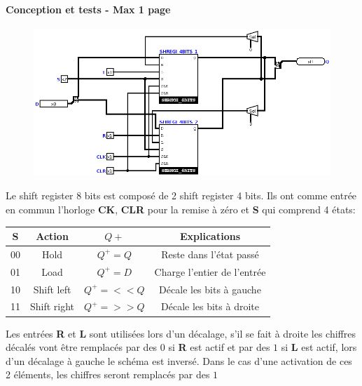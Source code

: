 \documentclass[a4paper]{article} %
\begin{document}
\begin{tcolorbox}[colframe=Monokaimagenta,colback=white]
\paragraph{Conception et tests - Max 1 page}
\begin{figure}[H]
    \centering
    \includegraphics[width=.8\textwidth]{src/SHREGI_8BITS.png}
    \label{fig:SHREGI_8}
\end{figure}

Le shift register 8 bits est composé de 2 shift register 4 bits.  Ils ont comme entrée en commun l'horloge \textbf{CK}, \textbf{CLR} pour la remise à zéro et \textbf{S} qui comprend 4 états: 

\begin{center}
    \begin{tabular}{|c|c|c|c|}
        \hline
        S  & Action      & $Q+$ & Explications\\
        \hline
        00 & Hold        & $Q^+ = Q$   & Reste dans l'état passé \\
        01 & Load        & $Q^+ = D$   & Charge l'entier de l'entrée \\
        10 & Shift left  & $Q^+ = <<Q$ & Décale les bits à gauche \\
        11 & Shift right & $Q^+ = >>Q$ & Décale les bits à droite \\
        \hline    
    \end{tabular}    
\end{center}

Les entrées \textbf{R} et \textbf{L} sont utilisées lors d'un décalage, s'il se fait à droite les chiffres décalés vont être remplacés par des $0$ si \textbf{R} est actif et par des $1$ si \textbf{L} est actif, lors d'un décalage à gauche le schéma est inversé. Dans le cas d'une activation de ces 2 éléments, les chiffres seront remplacés par des $1$\\


\end{tcolorbox}
\end{document}
